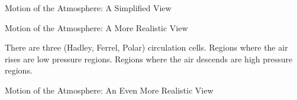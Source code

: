 \begin{myFrame}{Motion of the Atmosphere: A Simplified View}{}
\medskip

\def\h{0.5\th}


\end{myFrame}

\begin{myFrame}{Motion of the Atmosphere: A More Realistic View}{}
\medskip


\setCol \small
\begin{itemize}
\col There are three (Hadley, Ferrel, Polar) circulation cells.
\col Regions where the air rises are low pressure regions.
\col Regions where the air descends are high pressure regions.
\end{itemize}

\end{myFrame}

\begin{myFrame}{Motion of the Atmosphere: An Even More Realistic View}{}
\medskip


\end{myFrame}


